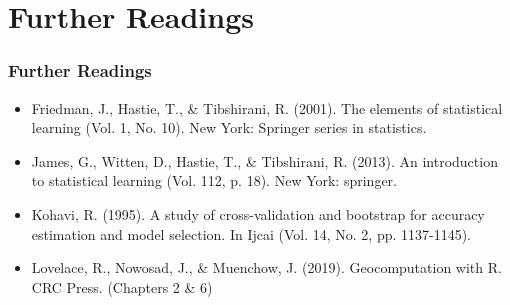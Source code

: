\documentclass[
  shownotes,
  xcolor={svgnames},
  hyperref={colorlinks,citecolor=DarkBlue,linkcolor=DarkRed,urlcolor=DarkBlue}
  , aspectratio=169]{beamer}
\begin{document}
\section{Further Readings}
\begin{frame}
\frametitle{Further Readings}

\begin{itemize}


  \item Friedman, J., Hastie, T., \& Tibshirani, R. (2001). The elements of statistical learning (Vol. 1, No. 10). New York: Springer series in statistics.
  \medskip
  \item James, G., Witten, D., Hastie, T., \& Tibshirani, R. (2013). An introduction to statistical learning (Vol. 112, p. 18). New York: springer.
  \medskip
    \item Kohavi, R. (1995). A study of cross-validation and bootstrap for accuracy estimation and model selection. In Ijcai (Vol. 14, No. 2, pp. 1137-1145).
  \medskip
  \item Lovelace, R., Nowosad, J., \& Muenchow, J. (2019). Geocomputation with R. CRC Press. (Chapters 2 \& 6)
\end{itemize}

\end{frame}






\end{document}
